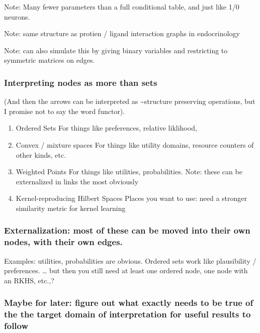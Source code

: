 \documentclass[11pt]{article}
\begin{document}
Note: Many fewer parameters than a full conditional table, and just like 1/0 neurons.

Note: same structure as protien / ligand interaction graphs in endocrinology

Note: can also simulate this by giving binary variables and restricting to symmetric matrices on edges.


\subsubsection{Interpreting nodes as more than sets}
\label{sec:org45c4840}
(And then the arrows can be interpreted as \textasciitilde{}structure preserving operations, but I promise not to say the word functor). 

\begin{enumerate}
\item Ordered Sets
\label{sec:orgaea4330}
For things like preferences, relative liklihood, 

\item Convex / mixture spaces
\label{sec:orgeed01aa}
For things like utility domains, resource counters of other kinds, etc.

\item Weighted Points
\label{sec:org0911714}
For things like utilities, probabilities.
Note: these can be externalized in links the most obviously

\item Kernel-reproducing Hilbert Spaces
\label{sec:org09b19b4}
Places you want to use: need a stronger similarity metric for kernel learning
\end{enumerate}

\subsubsection{Externalization: most of these can be moved into their own nodes, with their own edges.}
\label{sec:org106e882}
Examples: utilities, probabilities are obvious. Ordered sets work like plausibility / preferences.
\ldots{} but then you still need at least one ordered node, one node with an RKHS, etc.,?

\subsubsection{Maybe for later: figure out what exactly needs to be true of the the target domain of interpretation for useful results to follow}
\label{sec:orgb68e1be}
\end{document}
